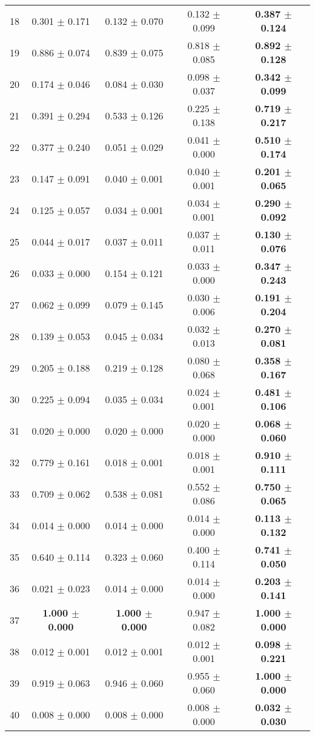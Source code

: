 \begin{table}[!ht]
{\begin{tabular}{r c c c c}
18 & 0.301 $\pm$ 0.171 & 0.132 $\pm$ 0.070 & 0.132 $\pm$ 0.099 & \textbf{0.387 $\pm$ 0.124} \\
19 & 0.886 $\pm$ 0.074 & 0.839 $\pm$ 0.075 & 0.818 $\pm$ 0.085 & \textbf{0.892 $\pm$ 0.128} \\
20 & 0.174 $\pm$ 0.046 & 0.084 $\pm$ 0.030 & 0.098 $\pm$ 0.037 & \textbf{0.342 $\pm$ 0.099} \\
21 & 0.391 $\pm$ 0.294 & 0.533 $\pm$ 0.126 & 0.225 $\pm$ 0.138 & \textbf{0.719 $\pm$ 0.217} \\
22 & 0.377 $\pm$ 0.240 & 0.051 $\pm$ 0.029 & 0.041 $\pm$ 0.000 & \textbf{0.510 $\pm$ 0.174} \\
23 & 0.147 $\pm$ 0.091 & 0.040 $\pm$ 0.001 & 0.040 $\pm$ 0.001 & \textbf{0.201 $\pm$ 0.065} \\
24 & 0.125 $\pm$ 0.057 & 0.034 $\pm$ 0.001 & 0.034 $\pm$ 0.001 & \textbf{0.290 $\pm$ 0.092} \\
25 & 0.044 $\pm$ 0.017 & 0.037 $\pm$ 0.011 & 0.037 $\pm$ 0.011 & \textbf{0.130 $\pm$ 0.076} \\
26 & 0.033 $\pm$ 0.000 & 0.154 $\pm$ 0.121 & 0.033 $\pm$ 0.000 & \textbf{0.347 $\pm$ 0.243} \\
27 & 0.062 $\pm$ 0.099 & 0.079 $\pm$ 0.145 & 0.030 $\pm$ 0.006 & \textbf{0.191 $\pm$ 0.204} \\
28 & 0.139 $\pm$ 0.053 & 0.045 $\pm$ 0.034 & 0.032 $\pm$ 0.013 & \textbf{0.270 $\pm$ 0.081} \\
29 & 0.205 $\pm$ 0.188 & 0.219 $\pm$ 0.128 & 0.080 $\pm$ 0.068 & \textbf{0.358 $\pm$ 0.167} \\
30 & 0.225 $\pm$ 0.094 & 0.035 $\pm$ 0.034 & 0.024 $\pm$ 0.001 & \textbf{0.481 $\pm$ 0.106} \\
31 & 0.020 $\pm$ 0.000 & 0.020 $\pm$ 0.000 & 0.020 $\pm$ 0.000 & \textbf{0.068 $\pm$ 0.060} \\
32 & 0.779 $\pm$ 0.161 & 0.018 $\pm$ 0.001 & 0.018 $\pm$ 0.001 & \textbf{0.910 $\pm$ 0.111} \\
33 & 0.709 $\pm$ 0.062 & 0.538 $\pm$ 0.081 & 0.552 $\pm$ 0.086 & \textbf{0.750 $\pm$ 0.065} \\
34 & 0.014 $\pm$ 0.000 & 0.014 $\pm$ 0.000 & 0.014 $\pm$ 0.000 & \textbf{0.113 $\pm$ 0.132} \\
35 & 0.640 $\pm$ 0.114 & 0.323 $\pm$ 0.060 & 0.400 $\pm$ 0.114 & \textbf{0.741 $\pm$ 0.050} \\
36 & 0.021 $\pm$ 0.023 & 0.014 $\pm$ 0.000 & 0.014 $\pm$ 0.000 & \textbf{0.203 $\pm$ 0.141} \\
37 & \textbf{1.000 $\pm$ 0.000} & \textbf{1.000 $\pm$ 0.000} & 0.947 $\pm$ 0.082 & \textbf{1.000 $\pm$ 0.000} \\
38 & 0.012 $\pm$ 0.001 & 0.012 $\pm$ 0.001 & 0.012 $\pm$ 0.001 & \textbf{0.098 $\pm$ 0.221} \\
39 & 0.919 $\pm$ 0.063 & 0.946 $\pm$ 0.060 & 0.955 $\pm$ 0.060 & \textbf{1.000 $\pm$ 0.000} \\
40 & 0.008 $\pm$ 0.000 & 0.008 $\pm$ 0.000 & 0.008 $\pm$ 0.000 & \textbf{0.032 $\pm$ 0.030} \\
\end{tabular}}
\end{table}
